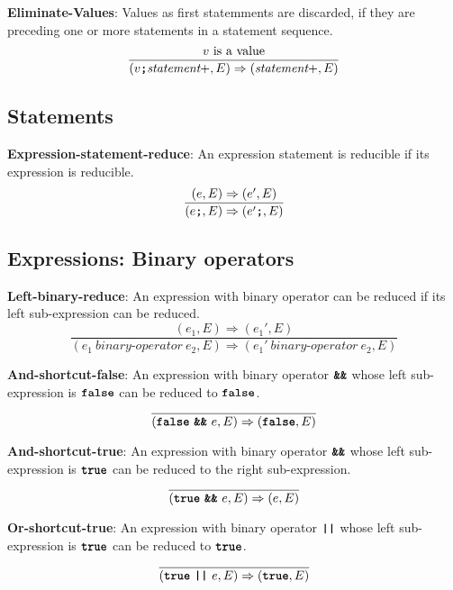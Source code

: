 \vspace{10mm}
\textbf{Eliminate-Values}: Values as first statemments are discarded, if
they are preceding one or more statements in a statement sequence.
\[
\frac{
v \ \mbox{is a value}
}{
(v \textbf{\texttt{;}} \textit{statement}+, E)
   \Rightarrow
  ( \textit{statement}+, E)
}
\]

\subsection*{Statements}

\textbf{Expression-statement-reduce}: An expression statement
is reducible if its expression is reducible.
\[
\frac{
  (e,E) \Rightarrow (e',E)
}{
  (e \textbf{\texttt{;}}, E)
  \Rightarrow
  (e' \textbf{\texttt{;}}, E)
}
\]

\subsection*{Expressions: Binary operators}

\textbf{Left-binary-reduce}: An expression with binary operator
can be reduced if its left sub-expression can be reduced.
\[
\frac{
  ( e_1 , E ) \Rightarrow (e_1', E)
}{
  (e_1\  \textit{binary-operator} \ e_2, E)
  \Rightarrow
  (e_1'\  \textit{binary-operator} \ e_2, E)
}
\]


\vspace{10mm}
\textbf{And-shortcut-false}: An expression with binary operator
$\textbf{\texttt{\&\&}}$ whose left sub-expression is
$\textbf{\texttt{false}}$ can be reduced to
$\textbf{\texttt{false}}$.
\[
\frac{
}{
  (\textbf{\texttt{false}}\  \textbf{\texttt{\&\&}}\ e, E)
  \Rightarrow
  (\textbf{\texttt{false}}, E)
}
\]

\vspace{10mm}
\textbf{And-shortcut-true}: An expression with binary operator
$\textbf{\texttt{\&\&}}$ whose left sub-expression is
$\textbf{\texttt{true}}$ can be reduced to
the right sub-expression.
\[
\frac{
}{
  (\textbf{\texttt{true}}\  \textbf{\texttt{\&\&}}\ e, E)
  \Rightarrow
  (e, E)
}
\]

\vspace{10mm}
\textbf{Or-shortcut-true}: An expression with binary operator
$\textbf{\texttt{||}}$ whose left sub-expression is
$\textbf{\texttt{true}}$ can be reduced to
$\textbf{\texttt{true}}$.
\[
\frac{
}{
  (\textbf{\texttt{true}}\  \textbf{\texttt{||}}\ e, E)
  \Rightarrow
  (\textbf{\texttt{true}}, E)
}
\]

